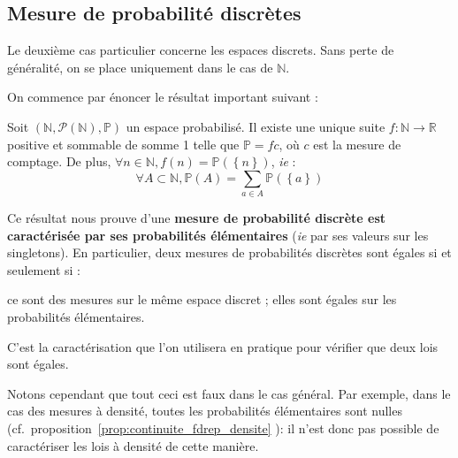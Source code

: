 \documentclass[../integ-proba.tex]{subfiles}
\begin{document}
    \subsection{Mesure de probabilité discrètes}
    Le deuxième cas particulier concerne les espaces discrets.
    Sans perte de généralité, on se place uniquement dans le cas de $\mathbb{N}$.

    On commence par énoncer le résultat important suivant :

    \begin{thm}
        Soit $\left(\mathbb{N}, \mathcal{P}(\mathbb{N}), \mathbb{P} \right)$ un espace probabilisé.
        Il existe une unique suite $f:\mathbb{N} \rightarrow \mathbb{R}$ positive et sommable de somme 1 telle que $\mathbb{P} = f c$, où $c$ est la mesure de comptage.
        De plus, $\forall n \in \mathbb{N}, f(n)=\mathbb{P}(\left\{n\right\})$, \textit{ie} :
        \begin{displaymath}
            \forall A \subset \mathbb{N}, \mathbb{P}(A) = \sum_{a \in A} \mathbb{P}(\left\{ a \right\})
        \end{displaymath}
    \end{thm}

    \begin{rem}
        Ce résultat nous prouve d'une \textbf{mesure de probabilité discrète est caractérisée par ses probabilités élémentaires} (\textit{ie} par ses valeurs sur les singletons).
        En particulier, deux mesures de probabilités discrètes sont égales si et seulement si :
        \begin{itemize}
            \itemb ce sont des mesures sur le même espace discret ;
            \itemb elles sont égales sur les probabilités élémentaires.
        \end{itemize}
        C'est la caractérisation que l'on utilisera en pratique pour vérifier que deux lois sont égales.

        Notons cependant que tout ceci est faux dans le cas général.
        Par exemple, dans le cas des mesures à densité, toutes les probabilités élémentaires sont nulles (cf.\ proposition~\ref{prop:continuite_fdrep_densite} ): il n'est donc pas possible de caractériser les lois à densité de cette manière.
    \end{rem}

\end{document}
